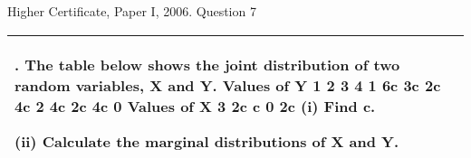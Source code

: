\documentclass[a4paper,12pt]{article}
\begin{document}
Higher Certificate, Paper I, 2006. Question 7

\begin{table}[ht!]
     
\centering
     
\begin{tabular}{|p{15cm}|}
     
\hline        

\noindent
7. The table below shows the joint distribution of two random variables, X and Y.
Values of Y
1
2
3
4
1
6c
3c
2c
4c
2
4c
2c
4c
0
Values of X
3
2c
c
0
2c
(i) Find c.

(ii) Calculate the marginal distributions of X and Y.
\\ \hline
      
\end{tabular}
    
\end{table}




\end{document}
